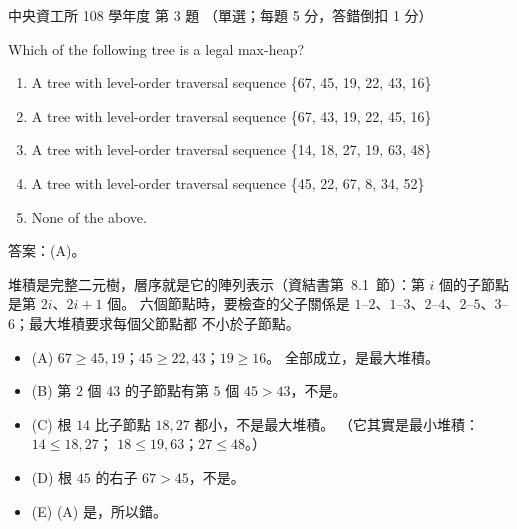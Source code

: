 \begin{pastexam}[label={px:ncu-108-dsa-03}]{中央資工所 108 學年度 第 3 題}
（單選；每題 5 分，答錯倒扣 1 分）

Which of the following tree is a legal max-heap?
\begin{enumerate}[label=(\Alph*)]
\item A tree with level-order traversal sequence \{67, 45, 19, 22, 43, 16\}
\item A tree with level-order traversal sequence \{67, 43, 19, 22, 45, 16\}
\item A tree with level-order traversal sequence \{14, 18, 27, 19, 63, 48\}
\item A tree with level-order traversal sequence \{45, 22, 67, 8, 34, 52\}
\item None of the above.
\end{enumerate}
\end{pastexam}

\begin{pastsoln}
答案：(A)。

堆積是完整二元樹，層序就是它的陣列表示（資結書第~8.1~節）：第 $i$ 個的子節點是第 $2i$、$2i+1$ 個。
六個節點時，要檢查的父子關係是 $1$--$2$、$1$--$3$、$2$--$4$、$2$--$5$、$3$--$6$；最大堆積要求每個父節點都
不小於子節點。
\begin{itemize}
\item (A) $67 \ge 45, 19$；$45 \ge 22, 43$；$19 \ge 16$。 全部成立，是最大堆積。
\item (B) 第 $2$ 個 $43$ 的子節點有第 $5$ 個 $45 > 43$，不是。
\item (C) 根 $14$ 比子節點 $18, 27$ 都小，不是最大堆積。 （它其實是最小堆積：$14 \le 18, 27$；
$18 \le 19, 63$；$27 \le 48$。）
\item (D) 根 $45$ 的右子 $67 > 45$，不是。
\item (E) (A) 是，所以錯。
\end{itemize}
\end{pastsoln}
